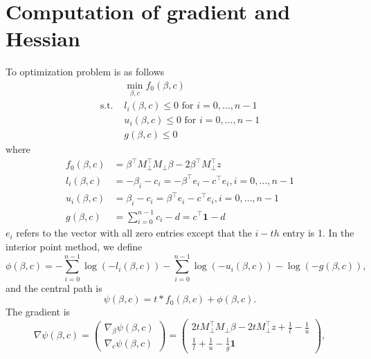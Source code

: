 \documentclass{article}
\begin{document}
\section{Computation of gradient and Hessian}
To optimization problem is as follows
    \begin{equation}\label{problem}
\begin{aligned}
     &\min_{\beta,c} f_0(\beta,c)   \\
     \text{s.t. } & l_i(\beta, c)\leq 0\text{ for }i=0,\dots,n-1\\
     &u_i(\beta, c)\leq 0\text{ for }i=0,\dots,n-1\\
     & g(\beta, c)\leq 0
\end{aligned}
\end{equation}
where
\begin{equation}\label{func_val}
    \begin{aligned}
        f_0(\beta, c) &= \beta^\top M_{\perp}^\top M_{\perp}\beta-2\beta^\top M_{\perp}^\top z \\
    l_i(\beta, c) &= -\beta_i-c_i = -\beta^\top e_i-c^\top e_i, i = 0,\dots, n-1\\
    u_i(\beta, c) &= \beta_i - c_i = \beta^\top e_i - c^\top e_i, i = 0, \dots, n-1\\    
    g(\beta, c) &= \sum_{i=0}^{n-1} c_i - d = c^\top \mathbf{1} - d
    \end{aligned}
\end{equation}
$e_i$ refers to the vector with all zero entries except that the $i-th$ entry is 1. 
In the interior point method, we define 
\begin{equation}
    \phi(\beta, c) = -\sum_{i=0}^{n-1} \log (-l_i(\beta, c)) - \sum_{i=0}^{n-1} \log (-u_i(\beta, c))  -\log (-g(\beta, c)),
\end{equation}
and the central path is
\begin{equation}
    \psi(\beta,c) = t*f_0(\beta,c)+\phi(\beta,c).
\end{equation}
The gradient is
\begin{equation}\label{gradient}
\nabla \psi(\beta, c) = \begin{pmatrix}
    \nabla_{\beta} \psi(\beta, c)\\
    \nabla_c \psi(\beta, c)
\end{pmatrix} = \begin{pmatrix}
    2t M_{\perp}^\top M_{\perp}\beta-2t M_{\perp}^\top z+\frac{1}{l}-\frac{1}{u}\\
    \frac{1}{l}+\frac{1}{u}-\frac{1}{g}\mathbf{1}
\end{pmatrix},
\end{equation}
\end{document}
